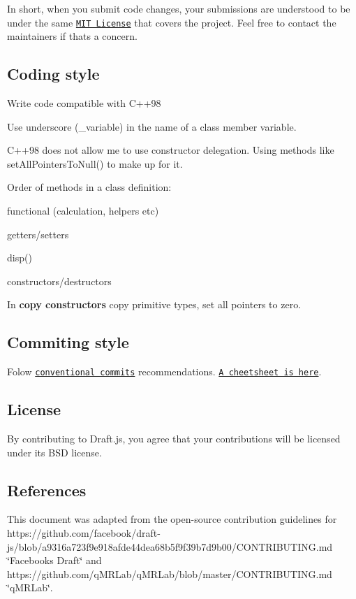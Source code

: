 In short, when you submit code changes, your submissions are understood to be under the same \href{http://choosealicense.com/licenses/mit/}{\tt M\+IT License} that covers the project. Feel free to contact the maintainers if that\textquotesingle{}s a concern.

\subsection*{Coding style}


\begin{DoxyItemize}
\item Write code compatible with C++98
\item Use underscore ({\ttfamily \+\_\+variable}) in the name of a class member variable.
\item C++98 does not allow me to use constructor delegation. Using methods like {\ttfamily set\+All\+Pointers\+To\+Null()} to make up for it.
\item Order of methods in a class definition\+:
\begin{DoxyItemize}
\item functional (calculation, helpers etc)
\item getters/setters
\item disp()
\item constructors/destructors
\end{DoxyItemize}
\item In {\bfseries copy constructors} copy primitive types, set all pointers to zero.
\end{DoxyItemize}

\subsection*{Commiting style}


\begin{DoxyItemize}
\item Folow \href{https://www.conventionalcommits.org/en/v1.0.0/}{\tt conventional commits} recommendations. \href{https://www.cheatography.com/albelop/cheat-sheets/conventional-commits/pdf/}{\tt A cheetsheet is here}.
\end{DoxyItemize}

\subsection*{License}

By contributing to Draft.\+js, you agree that your contributions will be licensed under its B\+SD license.

\subsection*{References}

This document was adapted from the open-\/source contribution guidelines for https\+://github.com/facebook/draft-\/js/blob/a9316a723f9e918afde44dea68b5f9f39b7d9b00/\+C\+O\+N\+T\+R\+I\+B\+U\+T\+I\+N\+G.\+md \char`\"{}\+Facebook\textquotesingle{}s Draft\char`\"{} and https\+://github.com/q\+M\+R\+Lab/q\+M\+R\+Lab/blob/master/\+C\+O\+N\+T\+R\+I\+B\+U\+T\+I\+N\+G.\+md \char`\"{}q\+M\+R\+Lab\char`\"{}. 
